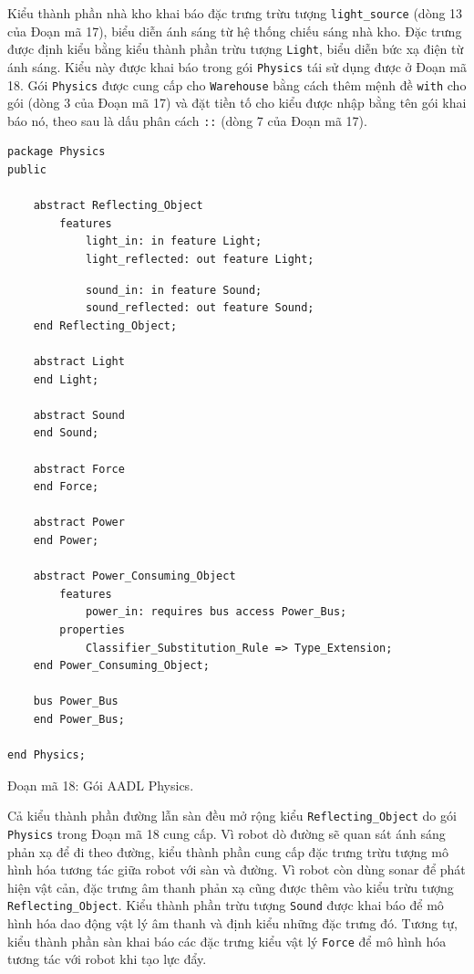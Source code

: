 Kiểu thành phần nhà kho khai báo đặc trưng trừu tượng \texttt{light\_source} (dòng 13 của Đoạn mã 17), biểu diễn ánh sáng từ hệ thống chiếu sáng nhà kho. Đặc trưng được định kiểu bằng kiểu thành phần trừu tượng \texttt{Light}, biểu diễn bức xạ điện từ ánh sáng. Kiểu này được khai báo trong gói \texttt{Physics} tái sử dụng được ở Đoạn mã 18. Gói \texttt{Physics} được cung cấp cho \texttt{Warehouse} bằng cách thêm mệnh đề \texttt{with} cho gói (dòng 3 của Đoạn mã 17) và đặt tiền tố cho kiểu được nhập bằng tên gói khai báo nó, theo sau là dấu phân cách \texttt{::} (dòng 7 của Đoạn mã 17).
\begin{verbatim}
package Physics
public

    abstract Reflecting_Object
        features
            light_in: in feature Light;
            light_reflected: out feature Light;
\end{verbatim}

\begin{verbatim}
            sound_in: in feature Sound;
            sound_reflected: out feature Sound;
    end Reflecting_Object;

    abstract Light
    end Light;

    abstract Sound
    end Sound;

    abstract Force
    end Force;

    abstract Power
    end Power;

    abstract Power_Consuming_Object
        features
            power_in: requires bus access Power_Bus;
        properties
            Classifier_Substitution_Rule => Type_Extension;
    end Power_Consuming_Object;

    bus Power_Bus
    end Power_Bus;

end Physics;
\end{verbatim}
\begin{center}\small Đoạn mã 18: Gói AADL Physics.\end{center}

Cả kiểu thành phần đường lẫn sàn đều mở rộng kiểu \texttt{Reflecting\_Object} do gói \texttt{Physics} trong Đoạn mã 18 cung cấp. Vì robot dò đường sẽ quan sát ánh sáng phản xạ để đi theo đường, kiểu thành phần cung cấp đặc trưng trừu tượng mô hình hóa tương tác giữa robot với sàn và đường. Vì robot còn dùng sonar để phát hiện vật cản, đặc trưng âm thanh phản xạ cũng được thêm vào kiểu trừu tượng \texttt{Reflecting\_Object}. Kiểu thành phần trừu tượng \texttt{Sound} được khai báo để mô hình hóa dao động vật lý âm thanh và định kiểu những đặc trưng đó. Tương tự, kiểu thành phần sàn khai báo các đặc trưng kiểu vật lý \texttt{Force} để mô hình hóa tương tác với robot khi tạo lực đẩy.

